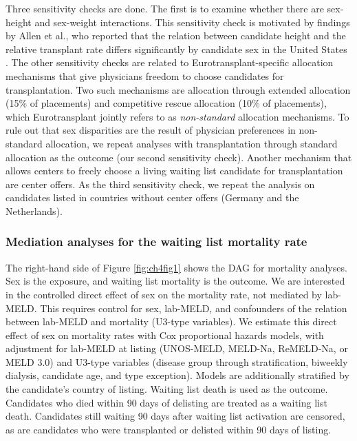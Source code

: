 \documentclass[11pt,twoside,]{book}
\begin{document}
Three sensitivity checks are done. The first is to examine whether
there are sex-height and sex-weight interactions. This sensitivity check is motivated by
findings by Allen et al., who reported that the relation between candidate
height and the relative transplant rate differs significantly by candidate sex
in the United States \citep{allenReducedAccessLiver2018}. The other sensitivity
checks are related to Eurotransplant-specific allocation mechanisms that give physicians freedom to
choose candidates for transplantation. Two such mechanisms are allocation
through extended allocation (15\% of placements) and competitive rescue
allocation (10\% of placements), which Eurotransplant jointly refers to as \emph{non-standard}
allocation mechanisms. To rule out that sex disparities
are the result of physician preferences in non-standard allocation, we
repeat analyses with transplantation through standard allocation as
the outcome (our second sensitivity check). Another mechanism that
allows centers to freely choose a living waiting list candidate for transplantation
are center offers. As the third sensitivity check, we repeat the analysis on candidates listed in
countries without center offers (Germany and the Netherlands).

\subsubsection{Mediation analyses for the waiting list mortality rate}\label{CHmediationmrt}

The right-hand side of Figure \ref{fig:ch4fig1} shows the DAG for mortality analyses.
Sex is the exposure, and waiting list mortality is the outcome. We are interested in the
controlled direct effect of sex on the mortality rate, not mediated by lab-MELD.
This requires control for sex, lab-MELD, and confounders of the relation between
lab-MELD and mortality (U3-type variables).
We estimate this direct effect of sex on mortality rates with Cox proportional
hazards models, with
adjustment for lab-MELD at listing (UNOS-MELD, MELD-Na, ReMELD-Na, or MELD 3.0) and
U3-type variables (disease group through
stratification, biweekly dialysis, candidate age, and type exception). Models are
additionally stratified by the candidate's country of listing. Waiting list death is used as the outcome.
Candidates who died within 90 days of delisting are treated as a waiting list death.
Candidates still waiting 90 days after waiting list activation are censored,
as are candidates who were transplanted or delisted within 90 days of listing.
\end{document}
